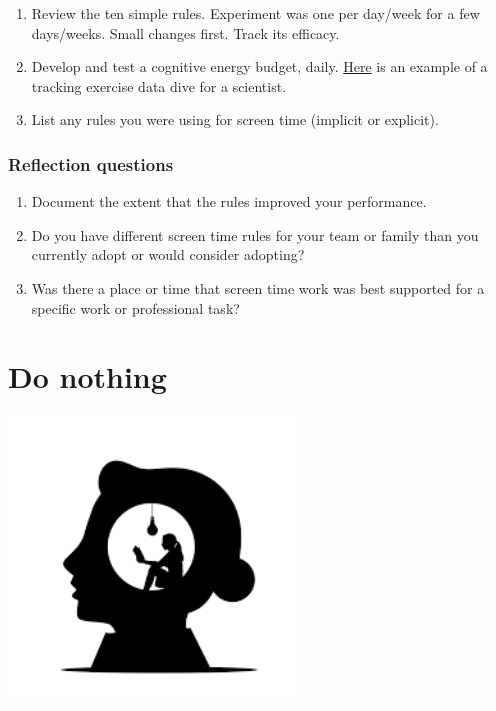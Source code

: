 \documentclass[
]{book}
\providecommand{\tightlist}{%
  \setlength{\itemsep}{0pt}\setlength{\parskip}{0pt}}
\begin{document}
\begin{enumerate}
\def\labelenumi{\arabic{enumi}.}
\tightlist
\item
  Review the ten simple rules. Experiment was one per day/week for a few days/weeks. Small changes first. Track its efficacy.\\
\item
  Develop and test a cognitive energy budget, daily. \href{https://figshare.com/articles/dataset/Cognitive_energy_budgets/19735525}{Here} is an example of a tracking exercise data dive for a scientist.
\item
  List any rules you were using for screen time (implicit or explicit).
\end{enumerate}

\hypertarget{reflection-questions-1}{%
\subsection*{Reflection questions}\label{reflection-questions-1}}

\begin{enumerate}
\def\labelenumi{\arabic{enumi}.}
\tightlist
\item
  Document the extent that the rules improved your performance.\\
\item
  Do you have different screen time rules for your team or family than you currently adopt or would consider adopting?\\
\item
  Was there a place or time that screen time work was best supported for a specific work or professional task?
\end{enumerate}

\hypertarget{nothing}{%
\chapter{Do nothing}\label{nothing}}

\includegraphics[width=3in,height=\textheight]{./nothing.png}
\end{document}
